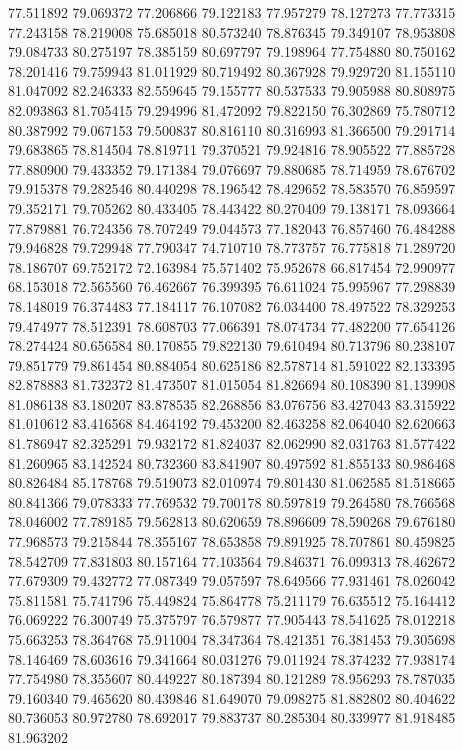 77.511892
79.069372
77.206866
79.122183
77.957279
78.127273
77.773315
77.243158
78.219008
75.685018
80.573240
78.876345
79.349107
78.953808
79.084733
80.275197
78.385159
80.697797
79.198964
77.754880
80.750162
78.201416
79.759943
81.011929
80.719492
80.367928
79.929720
81.155110
81.047092
82.246333
82.559645
79.155777
80.537533
79.905988
80.808975
82.093863
81.705415
79.294996
81.472092
79.822150
76.302869
75.780712
80.387992
79.067153
79.500837
80.816110
80.316993
81.366500
79.291714
79.683865
78.814504
78.819711
79.370521
79.924816
78.905522
77.885728
77.880900
79.433352
79.171384
79.076697
79.880685
78.714959
78.676702
79.915378
79.282546
80.440298
78.196542
78.429652
78.583570
76.859597
79.352171
79.705262
80.433405
78.443422
80.270409
79.138171
78.093664
77.879881
76.724356
78.707249
79.044573
77.182043
76.857460
76.484288
79.946828
79.729948
77.790347
74.710710
78.773757
76.775818
71.289720
78.186707
69.752172
72.163984
75.571402
75.952678
66.817454
72.990977
68.153018
72.565560
76.462667
76.399395
76.611024
75.995967
77.298839
78.148019
76.374483
77.184117
76.107082
76.034400
78.497522
78.329253
79.474977
78.512391
78.608703
77.066391
78.074734
77.482200
77.654126
78.274424
80.656584
80.170855
79.822130
79.610494
80.713796
80.238107
79.851779
79.861454
80.884054
80.625186
82.578714
81.591022
82.133395
82.878883
81.732372
81.473507
81.015054
81.826694
80.108390
81.139908
81.086138
83.180207
83.878535
82.268856
83.076756
83.427043
83.315922
81.010612
83.416568
84.464192
79.453200
82.463258
82.064040
82.620663
81.786947
82.325291
79.932172
81.824037
82.062990
82.031763
81.577422
81.260965
83.142524
80.732360
83.841907
80.497592
81.855133
80.986468
80.826484
85.178768
79.519073
82.010974
79.801430
81.062585
81.518665
80.841366
79.078333
77.769532
79.700178
80.597819
79.264580
78.766568
78.046002
77.789185
79.562813
80.620659
78.896609
78.590268
79.676180
77.968573
79.215844
78.355167
78.653858
79.891925
78.707861
80.459825
78.542709
77.831803
80.157164
77.103564
79.846371
76.099313
78.462672
77.679309
79.432772
77.087349
79.057597
78.649566
77.931461
78.026042
75.811581
75.741796
75.449824
75.864778
75.211179
76.635512
75.164412
76.069222
76.300749
75.375797
76.579877
77.905443
78.541625
78.012218
75.663253
78.364768
75.911004
78.347364
78.421351
76.381453
79.305698
78.146469
78.603616
79.341664
80.031276
79.011924
78.374232
77.938174
77.754980
78.355607
80.449227
80.187394
80.121289
78.956293
78.787035
79.160340
79.465620
80.439846
81.649070
79.098275
81.882802
80.404622
80.736053
80.972780
78.692017
79.883737
80.285304
80.339977
81.918485
81.963202
